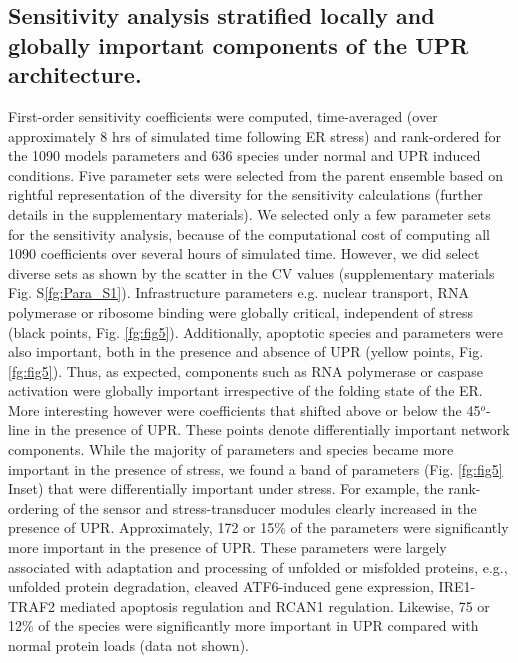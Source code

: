 \documentclass[fleqn,10pt]{wlscirep}
\begin{document}
\subsection*{Sensitivity analysis stratified locally and globally important components of the UPR architecture.} 
First-order sensitivity coefficients were computed, time-averaged (over approximately 8 hrs of simulated time following ER stress) and rank-ordered for the 1090 models parameters and 636 species under normal and UPR induced conditions. Five parameter sets were selected from the parent ensemble based on rightful representation of the diversity for the sensitivity calculations (further details in the supplementary materials). We selected only a few parameter sets for the sensitivity analysis, because of the computational cost of computing all 1090 coefficients over several hours of simulated time. However, we did select diverse sets as shown by the scatter in the CV values (supplementary materials Fig. S\ref{fg:Para_S1}). Infrastructure parameters e.g. nuclear transport, RNA polymerase or ribosome binding were globally critical, independent of stress (black points, Fig. \ref{fg:fig5}). Additionally, apoptotic species and parameters were also important, both in the presence and absence of UPR (yellow points, Fig. \ref{fg:fig5}). Thus, as expected, components such as RNA polymerase or caspase activation were globally important irrespective of the folding state of the ER. More interesting however were coefficients that shifted above or below the 45$^{o}$-line in the presence of UPR. These points denote differentially important network components. While the majority of parameters and species became more important in the presence of stress, we found a band of parameters (Fig. \ref{fg:fig5} Inset) that were differentially important under stress. For example, the rank-ordering of the sensor and stress-transducer modules clearly increased in the presence of UPR. Approximately, 172 or 15\% of the parameters were significantly more important in the presence of UPR. These parameters were largely associated with adaptation and processing of unfolded or misfolded proteins, e.g., unfolded protein degradation, cleaved ATF6-induced gene expression, IRE1-TRAF2 mediated apoptosis regulation and RCAN1 regulation. Likewise, 75 or 12\% of the species were significantly more important in UPR compared with normal protein loads (data not shown).
\end{document}
